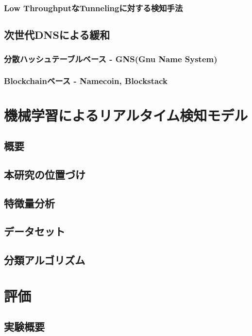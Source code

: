 \documentclass[12pt]{jarticle} %
\begin{document}
\subsubsection{Low ThroughputなTunnelingに対する検知手法}
\subsection{次世代DNSによる緩和}
\subsubsection{分散ハッシュテーブルベース - GNS(Gnu Name System)}
\subsubsection{Blockchainベース - Namecoin, Blockstack}



\newpage
\section{機械学習によるリアルタイム検知モデル}
\subsection{概要}
\subsection{本研究の位置づけ}
\subsection{特徴量分析}
\subsection{データセット}
\subsection{分類アルゴリズム}


\newpage
\section{評価}
\subsection{実験概要}
\end{document}
